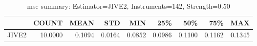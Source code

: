 \begin{table}[ht]
\centering
\caption{mse summary: Estimator=JIVE2, Instruments=142, Strength=0.50}
\begin{tabular}{lrrrrrrrr}
\toprule
 & COUNT & MEAN & STD & MIN & 25\% & 50\% & 75\% & MAX \\
\midrule
JIVE2 & 10.0000 & 0.1094 & 0.0164 & 0.0852 & 0.0986 & 0.1100 & 0.1162 & 0.1345 \\
\bottomrule
\end{tabular}
\end{table}
